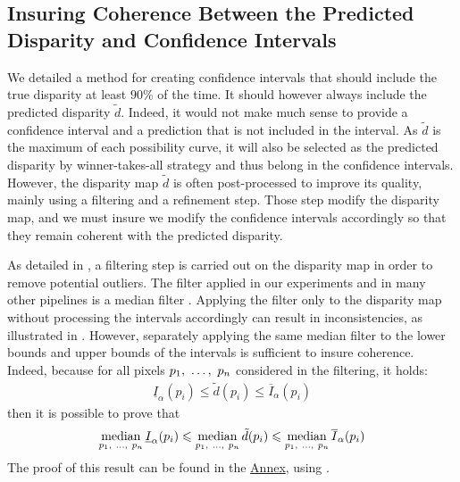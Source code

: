 \subsection{Insuring Coherence Between the Predicted Disparity and Confidence Intervals}\label{sec:coherence_disparity_intervals}
We detailed a method for creating confidence intervals that should include the true disparity at least $90\%$ of the time. It should however always include the predicted disparity $\tilde{d}$. Indeed, it would not make much sense to provide a confidence interval and a prediction that is not included in the interval. As $\tilde{d}$ is the maximum of each possibility curve, it will also be selected as the predicted disparity by winner-takes-all strategy and thus belong in the confidence intervals. However, the disparity map $\tilde{d}$ is often post-processed to improve its quality, mainly using a filtering and a refinement step. Those step modify the disparity map, and we must insure we modify the confidence intervals accordingly so that they remain coherent with the predicted disparity. 

As detailed in , a filtering step is carried out on the disparity map in order to remove potential outliers. The filter applied in our experiments and in many other pipelines is a median filter \cite{scharstein_taxonomy_2001}. Applying the filter only to the disparity map without processing the intervals accordingly can result in inconsistencies, as illustrated in . However, separately applying the same median filter to the lower bounds and upper bounds of the intervals is sufficient to insure coherence. Indeed, because for all pixels $p_1, ~\dots, ~ p_n$ considered in the filtering, it holds:
\begin{align}
    \underline{I}_\alpha(p_i)\leqslant \tilde{d}(p_i) \leqslant \overline{I}_\alpha(p_i)
\end{align}
then it is possible to prove that
\begin{align}
    \operatorname*{median}_{p_1, ~\dots, ~ p_n} \underline{I}_\alpha(p_i)\leqslant \operatorname*{median}_{p_1, ~\dots, ~ p_n}\tilde{d}(p_i) \leqslant \operatorname*{median}_{p_1, ~\dots, ~ p_n}\overline{I}_\alpha(p_i)
\end{align}
The proof of this result can be found in the \hyperref[chap:annex]{Annex}, using .

